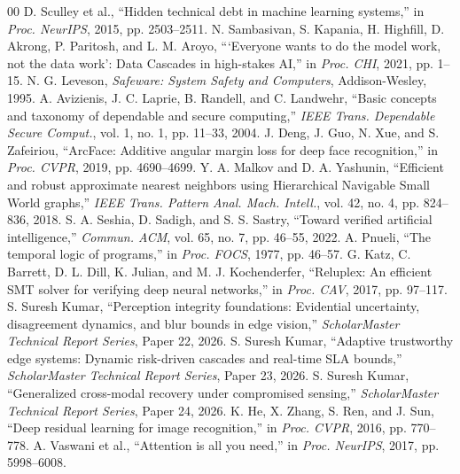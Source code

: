 \documentclass[conference]{IEEEtran}
\begin{document}
\begin{thebibliography}{00}
\small
{} D. Sculley et al., ``Hidden technical debt in machine learning systems,'' in \emph{Proc. NeurIPS}, 2015, pp. 2503--2511.
 N. Sambasivan, S. Kapania, H. Highfill, D. Akrong, P. Paritosh, and L. M. Aroyo, ```Everyone wants to do the model work, not the data work': Data Cascades in high-stakes AI,'' in \emph{Proc. CHI}, 2021, pp. 1--15.
 N. G. Leveson, \emph{Safeware: System Safety and Computers}, Addison-Wesley, 1995.
 A. Avizienis, J. C. Laprie, B. Randell, and C. Landwehr, ``Basic concepts and taxonomy of dependable and secure computing,'' \emph{IEEE Trans. Dependable Secure Comput.}, vol. 1, no. 1, pp. 11--33, 2004.
 J. Deng, J. Guo, N. Xue, and S. Zafeiriou, ``ArcFace: Additive angular margin loss for deep face recognition,'' in \emph{Proc. CVPR}, 2019, pp. 4690--4699.
 Y. A. Malkov and D. A. Yashunin, ``Efficient and robust approximate nearest neighbors using Hierarchical Navigable Small World graphs,'' \emph{IEEE Trans. Pattern Anal. Mach. Intell.}, vol. 42, no. 4, pp. 824--836, 2018.
 S. A. Seshia, D. Sadigh, and S. S. Sastry, ``Toward verified artificial intelligence,'' \emph{Commun. ACM}, vol. 65, no. 7, pp. 46--55, 2022.
 A. Pnueli, ``The temporal logic of programs,'' in \emph{Proc. FOCS}, 1977, pp. 46--57.
 G. Katz, C. Barrett, D. L. Dill, K. Julian, and M. J. Kochenderfer, ``Reluplex: An efficient SMT solver for verifying deep neural networks,'' in \emph{Proc. CAV}, 2017, pp. 97--117.
 S. Suresh Kumar, ``Perception integrity foundations: Evidential uncertainty, disagreement dynamics, and blur bounds in edge vision,'' \emph{ScholarMaster Technical Report Series}, Paper 22, 2026.
 S. Suresh Kumar, ``Adaptive trustworthy edge systems: Dynamic risk-driven cascades and real-time SLA bounds,'' \emph{ScholarMaster Technical Report Series}, Paper 23, 2026.
 S. Suresh Kumar, ``Generalized cross-modal recovery under compromised sensing,'' \emph{ScholarMaster Technical Report Series}, Paper 24, 2026.
 K. He, X. Zhang, S. Ren, and J. Sun, ``Deep residual learning for image recognition,'' in \emph{Proc. CVPR}, 2016, pp. 770--778.
 A. Vaswani et al., ``Attention is all you need,'' in \emph{Proc. NeurIPS}, 2017, pp. 5998--6008.

\end{thebibliography}
\end{document}
